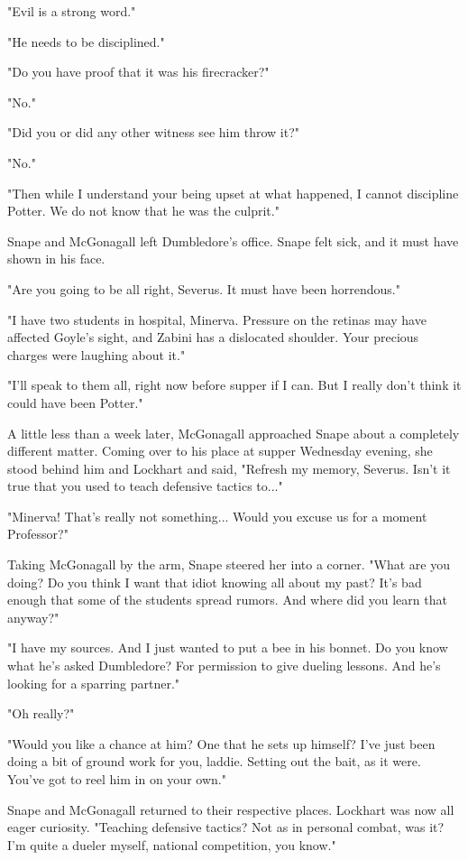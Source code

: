 \documentclass[a4paper,11pt]{article}
\begin{document}
"Evil is a strong word."

"He needs to be disciplined."

"Do you have proof that it was his firecracker?"

"No."

"Did you or did any other witness see him throw it?"

"No."

"Then while I understand your being upset at what happened, I cannot discipline Potter. We do not know that he was the culprit."

Snape and McGonagall left Dumbledore's office. Snape felt sick, and it must have shown in his face.

"Are you going to be all right, Severus. It must have been horrendous."

"I have two students in hospital, Minerva. Pressure on the retinas may have affected Goyle's sight, and Zabini has a dislocated shoulder. Your precious charges were laughing about it."

"I'll speak to them all, right now before supper if I can. But I really don't think it could have been Potter."

A little less than a week later, McGonagall approached Snape about a completely different matter. Coming over to his place at supper Wednesday evening, she stood behind him and Lockhart and said, "Refresh my memory, Severus. Isn't it true that you used to teach defensive tactics to..."

"Minerva! That's really not something... Would you excuse us for a moment Professor?"

Taking McGonagall by the arm, Snape steered her into a corner. "What are you doing? Do you think I want that idiot knowing all about my past? It's bad enough that some of the students spread rumors. And where did you learn that anyway?"

"I have my sources. And I just wanted to put a bee in his bonnet. Do you know what he's asked Dumbledore? For permission to give dueling lessons. And he's looking for a sparring partner."

"Oh really?"

"Would you like a chance at him? One that he sets up himself? I've just been doing a bit of ground work for you, laddie. Setting out the bait, as it were. You've got to reel him in on your own."

Snape and McGonagall returned to their respective places. Lockhart was now all eager curiosity. "Teaching defensive tactics? Not as in personal combat, was it? I'm quite a dueler myself, national competition, you know."
\end{document}
